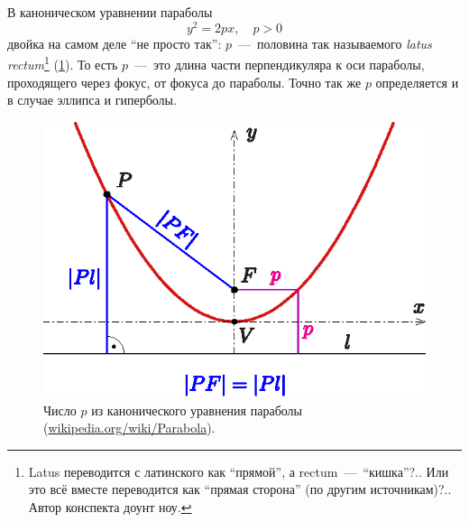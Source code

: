 \documentclass[a4paper,12pt]{article}
\begin{document}
  В каноническом уравнении параболы
  \[
    y^2 = 2px,\quad p > 0
  \]
  двойка на самом деле ``не просто так'': $p$~---~половина так называемого \emph{latus rectum}\footnote{Latus переводится с латинского как ``прямой'', а rectum~---~``кишка''?.. Или это всё вместе переводится как ``прямая сторона'' (по другим источникам)?.. Автор конспекта доунт ноу.} (\ref{fig:semi_latus_rectum}).
  То есть $p$~---~это длина части перпендикуляра к оси параболы, проходящего через фокус, от фокуса до параболы.
  Точно так же $p$ определяется и в случае эллипса и гиперболы.
  
  \begin{figure}[h]
    \centering

    \begin{minipage}[c]{0.4\textwidth}
      \includegraphics[width=\textwidth]{semi_latus_rectum}
    \end{minipage}\hfill
    \begin{minipage}[c]{0.55\textwidth}
      \caption{Число $p$ из канонического уравнения параболы (\href{https://en.wikipedia.org/wiki/Parabola}{wikipedia.org/wiki/Parabola}).}
      \label{fig:semi_latus_rectum}
    \end{minipage}
  \end{figure}
\end{document}
